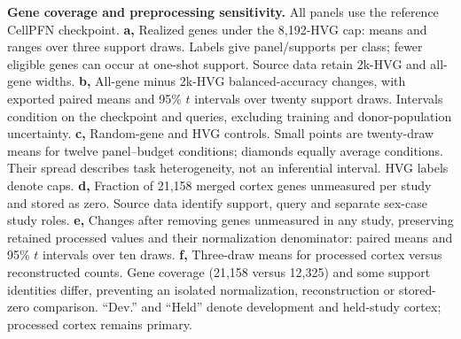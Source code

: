 \textbf{Gene coverage and preprocessing sensitivity.}
All panels use the reference CellPFN checkpoint.
\textbf{a,} Realized genes under the 8,192-HVG cap: means and ranges over three support draws. Labels give panel/supports per class; fewer eligible genes can occur at one-shot support. Source data retain 2k-HVG and all-gene widths.
\textbf{b,} All-gene minus 2k-HVG balanced-accuracy changes, with exported paired means and 95\% $t$ intervals over twenty support draws. Intervals condition on the checkpoint and queries, excluding training and donor-population uncertainty.
\textbf{c,} Random-gene and HVG controls. Small points are twenty-draw means for twelve panel--budget conditions; diamonds equally average conditions. Their spread describes task heterogeneity, not an inferential interval. HVG labels denote caps.
\textbf{d,} Fraction of 21,158 merged cortex genes unmeasured per study and stored as zero. Source data identify support, query and separate sex-case study roles.
\textbf{e,} Changes after removing genes unmeasured in any study, preserving retained processed values and their normalization denominator: paired means and 95\% $t$ intervals over ten draws.
\textbf{f,} Three-draw means for processed cortex versus reconstructed counts. Gene coverage (21,158 versus 12,325) and some support identities differ, preventing an isolated normalization, reconstruction or stored-zero comparison. ``Dev.'' and ``Held'' denote development and held-study cortex; processed cortex remains primary.
